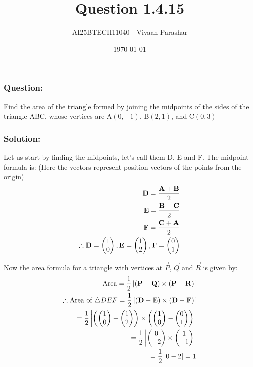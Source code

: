 \documentclass{beamer}
\title{Question 1.4.15}
\author{AI25BTECH11040 - Vivaan Parashar}
\date{\today}
\begin{document}
\frame{\titlepage}

\begin{frame}
    \frametitle{Question: }
    Find the area of the triangle formed by joining the midpoints of the sides of the triangle ABC, whose vertices are A$(0, -1)$, B$(2, 1)$, and C$(0, 3)$
\end{frame}

\begin{frame}
    \frametitle{Solution: }
    Let us start by finding the midpoints, let's call them D, E and F.
    The midpoint formula is: (Here the vectors represent position vectors of the points from the origin)
    \begin{align}
        \mathbf{D} = \frac{\mathbf{A}+\mathbf{B}}{2} \\
        \mathbf{E} = \frac{\mathbf{B}+\mathbf{C}}{2} \\
        \mathbf{F} = \frac{\mathbf{C}+\mathbf{A}}{2} \\
        \therefore \mathbf{D} = \begin{pmatrix}1       \\ 0\end{pmatrix}, \mathbf{E} = \begin{pmatrix}1 \\ 2\end{pmatrix}, \mathbf{F} = \begin{pmatrix}0 \\ 1\end{pmatrix}
    \end{align}
\end{frame}
\begin{frame}
    Now the area formula for a triangle with vertices at $\vec{P}$, $\vec{Q}$ and $\vec{R}$ is given by:
    \begin{align}
        \text{Area} = \frac{1}{2} \left| (\mathbf{P} - \mathbf{Q}) \times (\mathbf{P} - \mathbf{R}) \right|                              \\
        \therefore \text{Area of } \triangle DEF = \frac{1}{2} \left| (\mathbf{D} - \mathbf{E}) \times (\mathbf{D} - \mathbf{F}) \right| \\
        = \frac{1}{2} \left| \left( \begin{pmatrix}1 \\ 0\end{pmatrix} - \begin{pmatrix}1 \\ 2\end{pmatrix} \right) \times \left( \begin{pmatrix}1 \\ 0\end{pmatrix} - \begin{pmatrix}0 \\ 1\end{pmatrix} \right) \right|\\
        = \frac{1}{2} \left| \begin{pmatrix}0 \\ -2\end{pmatrix} \times \begin{pmatrix}1 \\ -1\end{pmatrix} \right|\\
        = \frac{1}{2} \left| 0 - 2 \right| = 1
    \end{align}
\end{frame}
\end{document}
